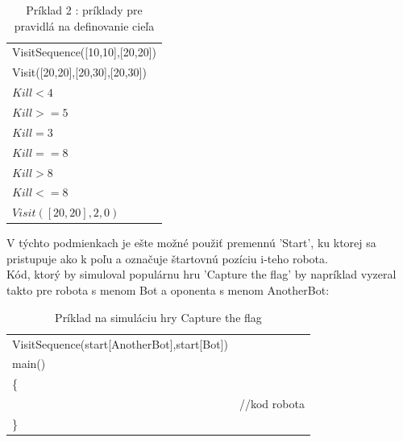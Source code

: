 \begin{table}
\centering
\begin{tabular}{l}
VisitSequence([10,10],[20,20])\\
Visit([20,20],[20,30],[20,30])\\
$Kill < 4$\\
$Kill >= 5$\\
$Kill \!= 3$\\
$Kill == 8$\\
$Kill > 8$\\
$Kill <= 8$\\
$Visit([20,20],2,0)$\\
\end{tabular}
\caption {Príklad 2 : príklady pre pravidlá na definovanie cieľa} %
\label{tab:allVis}
\end{table}

V týchto podmienkach je ešte možné použiť premennú 'Start', ku ktorej sa pristupuje ako k poľu a označuje štartovnú pozíciu i-teho robota.\\
Kód, ktorý by simuloval populárnu hru 'Capture the flag' by napríklad vyzeral takto pre robota s menom Bot a oponenta s menom AnotherBot:\\
\begin{table}
\centering
\begin{tabular}{l c}
VisitSequence(start[AnotherBot],start[Bot]) &\\ 
main()\\
\{\\
&//kod robota\\
\}\\
\end{tabular}
\caption{ Príklad na simuláciu hry Capture the flag }
\end{table}

